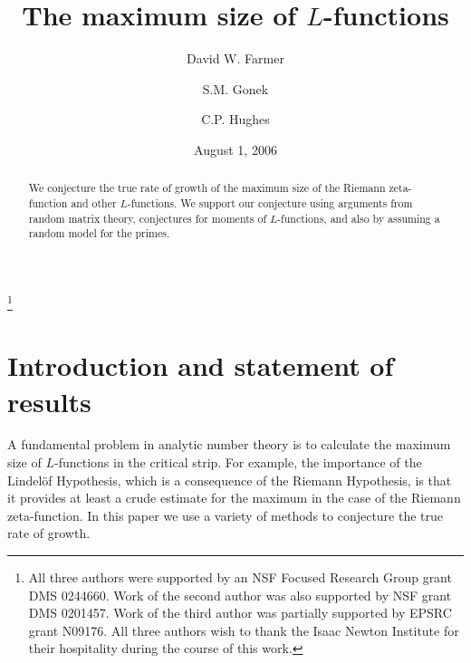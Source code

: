 \documentclass[10pt,reqno,twoside]{amsart}
\numberwithin{equation}{section}
\numberwithin{theorem}{section}
\begin{document}
\title{The maximum size of $L$-functions}

\author{David W. Farmer}
 \address{American Institute of Mathematics, 360 Portage Avenue, Palo Alto,
CA 94306-2244, USA.}

\author{S.M. Gonek}
\address{Department of Mathematics, University of Rochester, Rochester, NY 14627, USA}

\author{C.P. Hughes}
 \address{Department of Mathematics, University of
Michigan, Ann Arbor, MI 48109-1043, USA}

\thanks{All three authors were supported by an NSF Focused Research
Group grant DMS 0244660. Work of the second author was also
supported by NSF grant DMS 0201457. Work of the third author was
partially supported by EPSRC grant N09176. All three authors wish
to thank the Isaac Newton Institute for their hospitality during
the course of this work.}


  \date{August 1, 2006}

\begin{abstract}

We conjecture the true rate of growth of the maximum size of the
Riemann zeta-function and other $L$-functions. We support our
conjecture using arguments from random matrix
theory, conjectures for moments of $L$-functions,
and also by assuming a random model for the primes.

\end{abstract}

\maketitle

\section{Introduction and statement of results}\label{sect1}

A fundamental problem in analytic number theory is to calculate the
maximum size of $L$-functions in the critical strip. For example,
the importance of the Lindel\"of Hypothesis, which is a consequence of the
Riemann Hypothesis, is that it provides at least a crude estimate
for the maximum in the case of the Riemann zeta-function.
In this paper we  use a variety of methods to
conjecture the true rate of growth.
\end{document}
